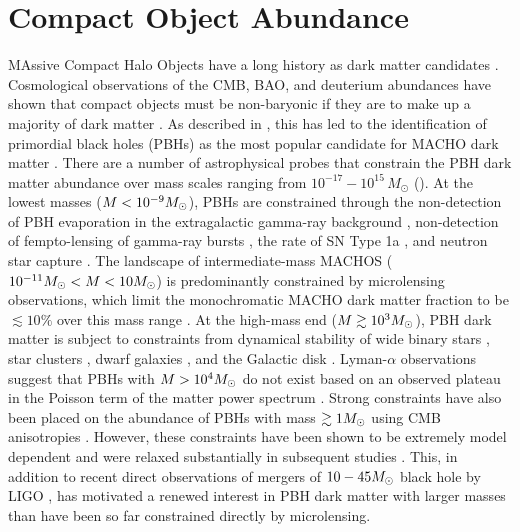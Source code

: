 \section{Compact Object Abundance }
\label{sec:compact_objects}

MAssive Compact Halo Objects \citep[MACHOs;][]{1991ApJ...366..412G} have a long history as dark matter candidates \citep{1974ApJ...193L...1O, 1980ApJS...44...73B, 1981ApJ...243..140G, 1986ApJ...304....1P, Bellido:1996, Clesse:2015, Bird:2016, Clesse:2016}. 
Cosmological observations of the CMB, BAO, and deuterium abundances have shown that compact objects must be non-baryonic if they are to make up a majority of dark matter \citep[\eg][]{Ade:2015xua}. 
As described in , this has led to the identification of primordial black holes (PBHs) as the most popular candidate for MACHO dark matter \citep{Bellido:1996}.
There are a number of astrophysical probes that constrain the PBH dark matter abundance over mass scales ranging from $10^{-17}-10^{15}\,M_\odot$ ().
At the lowest masses ($M < 10^{-9}M_\odot$), PBHs are constrained through the non-detection of PBH evaporation in the extragalactic gamma-ray background \citep[\eg,][]{0912.5297, 1604.05349}, non-detection of fempto-lensing of gamma-ray bursts \citep[\eg,][]{1204.2056}, the rate of SN Type 1a \citep{1805.07381}, and neutron star capture \citep[\eg,][]{2013PhRvD..87l3524C}.
The landscape of intermediate-mass MACHOS ($10^{-11} M_\odot < M < 10 M_\odot$) is predominantly constrained by microlensing observations, which limit the monochromatic MACHO dark matter fraction to be $\lesssim 10\%$ over this mass range \citep[\eg][]{2001ApJ...550L.169A, 2007A&A...469..387T, 2009MNRAS.397.1228W, 1701.02151}.
At the high-mass end ($M \gtrsim 10^3M_\odot$), PBH dark matter is subject to constraints from dynamical stability of wide binary stars \citep[\eg][]{2009MNRAS.396L..11Q, 2004ApJ...601..311Y}, star clusters \citep[\eg][]{2016ApJ...824L..31B, 1611.05052}, dwarf galaxies \citep{1704.01668}, and the Galactic disk \citep[\eg][]{1985ApJ...299..633L, 1994ApJ...437..184X}.
Lyman-$\alpha$ observations suggest that PBHs with $M > 10^4M_\odot$ do not exist based on an observed plateau in the Poisson term of the matter power spectrum \citep{astro-ph/0302035}.
Strong constraints have also been placed on the abundance of PBHs with mass $\gtrsim 1 M_\odot$ using CMB anisotropies \citep{2008ApJ...680..829R}.
However, these constraints have been shown to be extremely model dependent and were relaxed substantially in subsequent studies \citep{1612.05644}.
This, in addition to recent direct observations of mergers of $10-45 M_\odot$ black hole by LIGO \citep{1602.03837},
has motivated a renewed interest in PBH dark matter with larger masses than have been so far constrained directly by microlensing.

